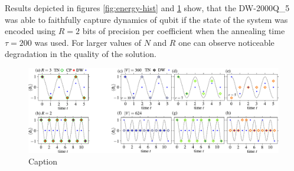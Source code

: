Results depicted in figures \ref{fig:energy-hist} and \ref{fig:cplex_tn_dwave} show, that the DW-2000Q\_{5} was able to faithfully capture dynamics of qubit if the state of the system was encoded using $R=2$ bits of precision per coefficient when the annealing time $\tau=200$ was used. For larger values of $N$ and $R$ one can observe noticeable degradation in the quality of the solution.

\begin{figure}
    \centering
    \includegraphics[width=\textwidth]{figures/fig34_merge.pdf}
    \caption{Caption}
    \label{fig:cplex_tn_dwave}
\end{figure}


